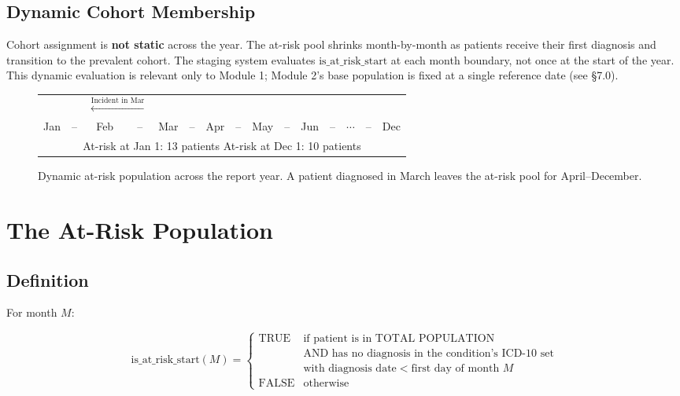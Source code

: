 \documentclass[11pt,a4paper]{article}
\begin{document}
\subsection{Dynamic Cohort Membership}

Cohort assignment is \textbf{not static} across the year. The at-risk pool shrinks month-by-month as patients receive their first diagnosis and transition to the prevalent cohort. The staging system evaluates $\text{is\_at\_risk\_start}$ at each month boundary, not once at the start of the year. This dynamic evaluation is relevant only to Module 1; Module 2's base population is fixed at a single reference date (see §7.0).

\begin{figure}[ht]
\centering
\begin{tabular}{ccccccccccccccc}
 & & \multicolumn{2}{c}{$\xleftarrow{\text{Incident in Mar}}$} \\
Jan & -- & Feb & -- & Mar & -- & Apr & -- & May & -- & Jun & -- & $\cdots$ & -- & Dec \\[6pt]
\multicolumn{15}{c}{At-risk at Jan 1: 13 patients \hspace{2cm} At-risk at Dec 1: 10 patients}
\end{tabular}
\caption{Dynamic at-risk population across the report year. A patient diagnosed in March leaves the at-risk pool for April--December.}
\end{figure}

\section{The At-Risk Population}

\subsection{Definition}

For month $M$:

\begin{equation}
\text{is\_at\_risk\_start}(M) =
\begin{cases}
\text{TRUE} & \text{if patient is in TOTAL POPULATION} \\
            & \text{AND has no diagnosis in the condition's ICD-10 set} \\
            & \text{with diagnosis date} < \text{first day of month } M \\[4pt]
\text{FALSE} & \text{otherwise}
\end{cases}
\end{equation}
\end{document}
